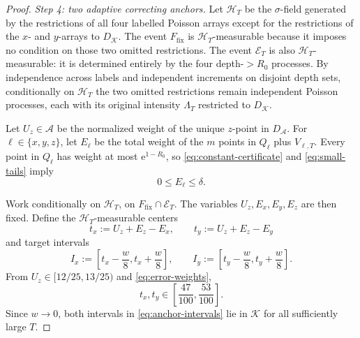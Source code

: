 \documentclass[11pt]{article}
\numberwithin{equation}{section}
\theoremstyle{plain}
\newcommand{\1}{\mathbf 1}
\newcommand{\e}{\mathrm e}
\begin{document}
\begin{proof}
\smallskip
\noindent\emph{Step 4: two adaptive correcting anchors.}
Let $\mathcal H_T$ be the $\sigma$-field generated by the restrictions of
all four labelled Poisson arrays except for the restrictions of the
$x$- and $y$-arrays to $D_{\mathcal K}$.  The event
$F_{\mathrm{fix}}$ is $\mathcal H_T$-measurable because it imposes no
condition on those two omitted restrictions.  The event $\mathcal E_T$ is
also $\mathcal H_T$-measurable: it is determined entirely by the four
depth-$>R_0$ processes.  By independence across labels and independent
increments on disjoint depth sets, conditionally on $\mathcal H_T$ the
two omitted restrictions remain independent Poisson processes, each with
its original intensity $\Lambda_T$ restricted to $D_{\mathcal K}$.

Let $U_z\in\mathcal A$ be the normalized weight of the unique $z$-point in
$D_{\mathcal A}$.  For $\ell\in\{x,y,z\}$, let $E_\ell$ be the total weight
of the $m$ points in $Q_\ell$ plus $V_{\ell,T}$.  Every point in $Q_\ell$
has weight at most $\e^{1-R_0}$, so
\eqref{eq:constant-certificate} and \eqref{eq:small-tails} imply
\begin{equation}\label{eq:error-weights}
 0\le E_\ell\le\delta.
\end{equation}

Work conditionally on $\mathcal H_T$, on
$F_{\mathrm{fix}}\cap\mathcal E_T$.  The variables
$U_z,E_x,E_y,E_z$ are then fixed.
Define the $\mathcal H_T$-measurable centers
\begin{equation}\label{eq:anchor-centers}
 t_x:=U_z+E_z-E_x,
 \qquad
 t_y:=U_z+E_z-E_y
\end{equation}
and target intervals
\begin{equation}\label{eq:anchor-intervals}
 I_x:=\left[t_x-\frac w8,t_x+\frac w8\right],
 \qquad
 I_y:=\left[t_y-\frac w8,t_y+\frac w8\right].
\end{equation}
From $U_z\in[12/25,13/25)$ and \eqref{eq:error-weights},
\[
 t_x,t_y\in\left[\frac{47}{100},\frac{53}{100}\right].
\]
Since $w\to0$, both intervals in \eqref{eq:anchor-intervals} lie in
$\mathcal K$ for all sufficiently large $T$.


\end{proof}
\end{document}
